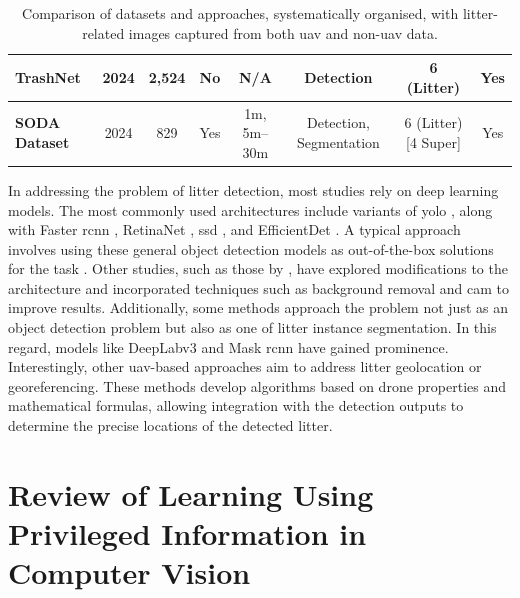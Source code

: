 \begin{table}[htbp]
\begin{adjustbox}{max width=\textwidth, center}
\begin{tabular}{|l|c|c|c|c|c|c|c|}
\textbf{TrashNet \cite{trashnet}} & 2024 & 2,524 & No & N/A\footnotemark[2] & Detection & 6 (Litter)  &Yes\\\hline
\textbf{SODA Dataset \cite{soda_dataset}} & 2024 & 829 & Yes & 1m, 5m--30m & Detection, Segmentation & 6 (Litter) [4 Super]  &Yes\\\hline
\end{tabular}
\renewcommand{\arraystretch}{1}
\end{adjustbox}
\caption{Comparison of datasets and approaches, systematically organised, with litter-related images captured from both \gls{uav} and non-\gls{uav} data.}
\label{tab:lit_review}
\end{table}


In addressing the problem of litter detection, most studies rely on deep learning models. The most commonly used architectures include variants of \gls{yolo} \cite{yolo, yolov5, yolov8}, along with Faster \gls{rcnn} \cite{fasterrcnn}, RetinaNet \cite{retinanet}, \gls{ssd} \cite{ssd}, and EfficientDet \cite{efficientdet}. A typical approach involves using these general object detection models as out-of-the-box solutions for the task \cite{soda_dataset, detect_litter, plastopol, beach_litter}. Other studies, such as those by \cite{small_litter_detection, styrofoam}, have explored modifications to the architecture and incorporated techniques such as background removal and \gls{cam} to improve results.
Additionally, some methods \cite{taco2020, mju_waste, zerowaste} approach the problem not just as an object detection problem but also as one of litter instance segmentation. In this regard, models like DeepLabv3 \cite{deeplabv3} and Mask \gls{rcnn} \cite{maskrcnn} have gained prominence. Interestingly, other \gls{uav}-based approaches \cite{beach_litter,haida,uavvaste} aim to address litter geolocation or georeferencing. These methods develop algorithms based on drone properties and mathematical formulas, allowing integration with the detection outputs to determine the precise locations of the detected litter.


\section{Review of Learning Using Privileged Information in Computer Vision}
\label{subsec:2_lupi}

